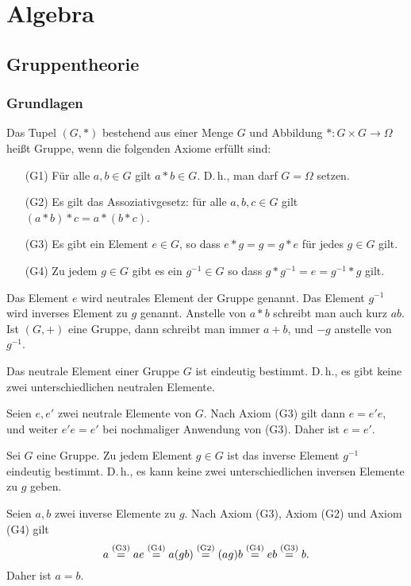 
\chapter{Algebra}

\section{Gruppentheorie}

\subsection{Grundlagen}

\begin{Definition}[Gruppe]
Das Tupel $(G,*)$ bestehend aus einer Menge $G$ und
Abbildung $*\colon G\times G\to\Omega$ heißt Gruppe, wenn die folgenden
Axiome erfüllt sind:
\begin{enumerate}
\item[(G1)] Für alle $a,b\in G$ gilt $a*b\in G$. D.\,h., man darf $G=\Omega$ setzen.
\item[(G2)] Es gilt das Assoziativgesetz: für alle $a,b,c\in G$ gilt $(a*b)*c=a*(b*c)$.
\item[(G3)] Es gibt ein Element $e\in G$, so dass $e*g=g=g*e$ für jedes $g\in G$ gilt.
\item[(G4)] Zu jedem $g\in G$ gibt es ein $g^{-1}\in G$ so dass $g*g^{-1}=e=g^{-1}*g$ gilt.
\end{enumerate}
Das Element $e$ wird neutrales Element der Gruppe genannt.
Das Element $g^{-1}$ wird inverses Element zu $g$ genannt.
Anstelle von $a*b$ schreibt man auch kurz $ab$. Ist $(G,+)$ eine
Gruppe, dann schreibt man immer $a+b$, und $-g$ anstelle von $g^{-1}$.
\end{Definition}

\begin{Satz}
Das neutrale Element einer Gruppe $G$ ist eindeutig bestimmt.
D.\,h., es gibt keine zwei unterschiedlichen neutralen Elemente. 
\end{Satz}
\begin{Beweis}
Seien $e,e'$ zwei neutrale Elemente von $G$. Nach Axiom (G3)
gilt dann $e=e'e$, und weiter $e'e=e'$ bei nochmaliger Anwendung
von (G3). Daher ist $e=e'$.\;\qedsymbol
\end{Beweis}

\begin{Satz}
Sei $G$ eine Gruppe. Zu jedem Element $g\in G$ ist das inverse
Element $g^{-1}$ eindeutig bestimmt. D.\,h., es kann keine zwei
unterschiedlichen inversen Elemente zu $g$ geben.
\end{Satz}
\begin{Beweis}
Seien $a,b$ zwei inverse Elemente zu $g$. Nach Axiom (G3), Axiom (G2)
und Axiom (G4) gilt
\[a \stackrel{\mathrm{(G3)}}{=} ae \stackrel{\mathrm{(G4)}}{=} a(gb) \stackrel{\mathrm{(G2)}}{=} (ag)b \stackrel{\mathrm{(G4)}}{=} eb \stackrel{\mathrm{(G3)}}{=} b.\]
Daher ist $a=b$.\;\qedsymbol
\end{Beweis}

